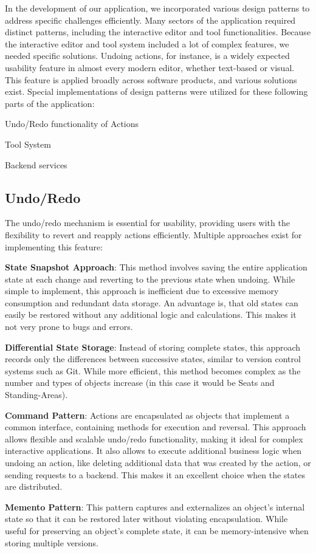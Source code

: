 In the development of our application, we incorporated various design patterns to address specific challenges efficiently. Many sectors of the application required distinct patterns, including the interactive editor and tool functionalities. Because the interactive editor and tool system included a lot of complex features, we needed specific solutions. Undoing actions, for instance, is a widely expected usability feature in almost every modern editor, whether text-based or visual. This feature is applied broadly across software products, and various solutions exist. Special implementations of design patterns were utilized for these following parts of the application:
\begin{compactitem}
\item Undo/Redo functionality of Actions
\item Tool System
\item Backend services
\end{compactitem}

\subsection{Undo/Redo}
\label{sec:undo-redo}

The undo/redo mechanism is essential for usability, providing users with the flexibility to revert and reapply actions efficiently. Multiple approaches exist for implementing this feature:

\begin{compactenum}
\item \textbf{State Snapshot Approach}: This method involves saving the entire application state at each change and reverting to the previous state when undoing. While simple to implement, this approach is inefficient due to excessive memory consumption and redundant data storage. An advantage is, that old states can easily be restored without any additional logic and calculations. This makes it not very prone to bugs and errors.
\item \textbf{Differential State Storage}: Instead of storing complete states, this approach records only the differences between successive states, similar to version control systems such as Git. While more efficient, this method becomes complex as the number and types of objects increase (in this case it would be Seats and Standing-Areas).
\item \textbf{Command Pattern}: Actions are encapsulated as objects that implement a common interface, containing methods for execution and reversal. This approach allows flexible and scalable undo/redo functionality, making it ideal for complex interactive applications. It also allows to execute additional business logic when undoing an action, like deleting additional data that was created by the action, or sending requests to a backend. This makes it an excellent choice when the states are distributed.
\item \textbf{Memento Pattern}: This pattern captures and externalizes an object's internal state so that it can be restored later without violating encapsulation. While useful for preserving an object's complete state, it can be memory-intensive when storing multiple versions.
\end{compactenum}

